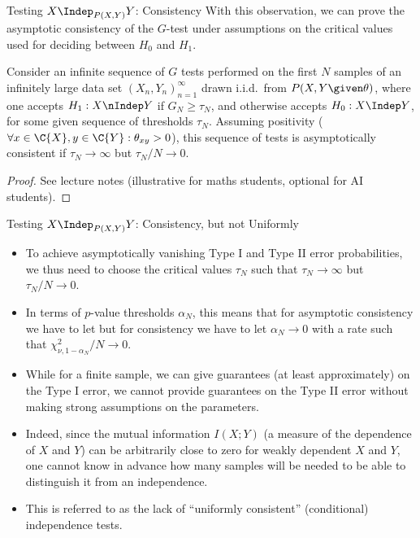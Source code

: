 \begin{frame}{Testing $X \Indep_{P(X,Y)} Y$: Consistency}
With this observation, we can prove the asymptotic consistency of the $G$-test under assumptions on the critical values used
for deciding between $H_0$ and $H_1$. 
\begin{Cor}
Consider an infinite sequence of $G$ tests performed on the first $N$ samples of an infinitely large
data set $(X_n,Y_n)_{n=1}^\infty$ drawn i.i.d.\ from $P(X,Y \given \theta)$, 
where one accepts $H_1 : X \nIndep Y$ if $G_N \ge \tau_N$, and otherwise accepts $H_0 : X \Indep Y$, 
for some given sequence of thresholds $\tau_N$.
Assuming positivity ($\forall x \in \C{X}, y\in \C{Y}: \theta_{xy} > 0$), 
this sequence of tests is asymptotically consistent if $\tau_N \to \infty$ but $\tau_N / N \to 0$.
\end{Cor}
\begin{proof}
See lecture notes (illustrative for maths students, optional for AI students).
\end{proof}
\end{frame}

\begin{frame}{Testing $X \Indep_{P(X,Y)} Y$: Consistency, but not Uniformly}
  \begin{itemize}
    \item To achieve asymptotically vanishing Type I and Type II error probabilities, we thus need 
      to choose the critical values $\tau_N$ such that $\tau_N \to \infty$ but $\tau_N / N \to 0$.
    \item In terms of $p$-value thresholds $\alpha_N$, this means that for asymptotic consistency we have to let
       but for consistency we have to let $\alpha_N \to 0$ with a rate such that $\chi^2_{\nu,1-\alpha_N} / N \to 0$.
    \item While for a finite sample, we can give guarantees (at least approximately) on the Type I error, we cannot
      provide guarantees on the Type II error without making strong assumptions on the parameters. 
    \item Indeed, since the mutual information $I(X;Y)$ (a measure of
the dependence of $X$ and $Y$) can be arbitrarily close to zero for weakly dependent $X$ 
and $Y$, one cannot know in advance how many samples will be needed to be able to distinguish
it from an independence.
    \item This is referred to as the lack of ``uniformly consistent'' (conditional) independence tests.
  \end{itemize}
\end{frame}

